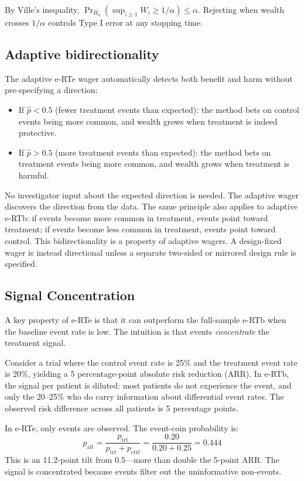 \documentclass[10pt]{article}
\begin{document}
By Ville's inequality, $\Pr_{H_0}(\sup_{i \geq 1} W_i \geq 1/\alpha) \leq \alpha$. Rejecting when wealth crosses $1/\alpha$ controls Type I error at any stopping time.

\subsection{Adaptive bidirectionality}

The adaptive e-RTe wager automatically detects both benefit and harm without pre-specifying a direction:
\begin{itemize}
    \item If $\hat{p} < 0.5$ (fewer treatment events than expected): the method bets on control events being more common, and wealth grows when treatment is indeed protective.
    \item If $\hat{p} > 0.5$ (more treatment events than expected): the method bets on treatment events being more common, and wealth grows when treatment is harmful.
\end{itemize}

No investigator input about the expected direction is needed. The adaptive wager discovers the direction from the data. The same principle also applies to adaptive e-RTb: if events become more common in treatment, events point toward treatment; if events become less common in treatment, events point toward control. This bidirectionality is a property of adaptive wagers. A design-fixed wager is instead directional unless a separate two-sided or mirrored design rule is specified.

\subsection{Signal Concentration}

A key property of e-RTe is that it can outperform the full-sample e-RTb when the baseline event rate is low. The intuition is that events \emph{concentrate} the treatment signal.

Consider a trial where the control event rate is 25\% and the treatment event rate is 20\%, yielding a 5 percentage-point absolute risk reduction (ARR). In e-RTb, the signal per patient is diluted: most patients do not experience the event, and only the 20--25\% who do carry information about differential event rates. The observed risk difference across all patients is 5 percentage points.

In e-RTe, only events are observed. The event-coin probability is:
\begin{equation}
p_{\text{alt}} = \frac{p_{\text{trt}}}{p_{\text{trt}} + p_{\text{ctrl}}} = \frac{0.20}{0.20 + 0.25} = 0.444
\end{equation}
This is an 11.2-point tilt from 0.5---more than double the 5-point ARR. The signal is concentrated because events filter out the uninformative non-events.
\end{document}
